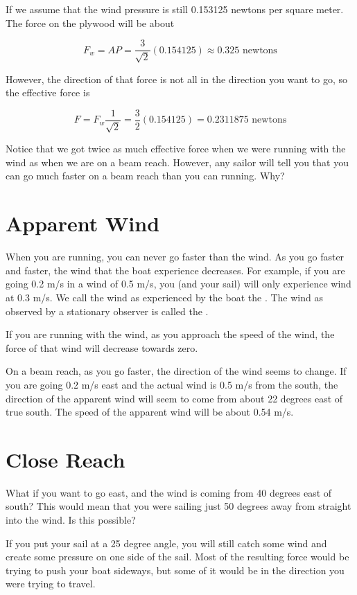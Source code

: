 If we assume that the wind pressure is still 0.153125 newtons per square meter. The force on the plywood will be about

$$F_w = A P = \frac{3}{\sqrt{2}}(0.154125) \approx 0.325 \text{ newtons}$$

However, the direction of that force is not all in the direction you want to go, so the effective force is

$$F = F_w \frac{1}{\sqrt{2}} =  \frac{3}{2}(0.154125) = 0.2311875 \text{ newtons}$$

Notice that we got twice as much effective force when we were running with the wind as when we are on a beam reach.  However, any sailor will tell you that you can go much faster
on a beam reach than you can running. Why?

\section{Apparent Wind}

When you are running,  you can never go faster than the wind.   As you go faster and faster,  the wind that the boat experience decreases. For example, if you are going 0.2 m/s in a wind 
of 0.5 m/s,  you (and your sail) will only experience wind at 0.3 m/s. We call the wind as experienced by the boat 
the .  The wind as observed by a stationary observer is called the .

If you are running with the wind, as you approach the speed of the wind,  the force of that wind will decrease towards zero.

On a beam reach, as you go faster, the direction of the wind seems to change. If you are going 0.2 m/s east and the actual wind is 0.5 m/s from the south, the direction of the 
apparent wind will seem to come from about 22 degrees east of true south.  The speed of the apparent wind will be about 0.54 m/s.

\section{Close Reach}

What if you want to go east,  and the wind is coming from 40 degrees east of south?  This would mean that you were sailing just 50 degrees away from 
straight into the wind. Is this possible?

If you put your sail at a 25 degree angle, you will still catch some wind and create some pressure on one side of the sail.  Most of the resulting force would be trying to push
your boat sideways,  but some of it would be in the direction you were trying to travel. 

